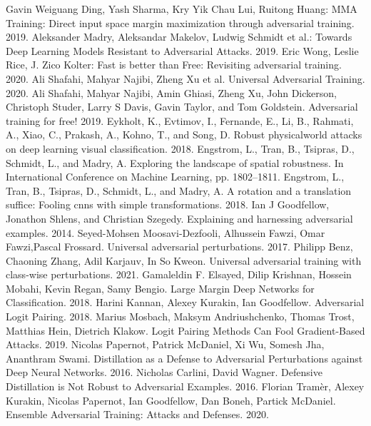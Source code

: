 \documentclass{article}
\begin{document}
\begin{thebibliography}{00}

     Gavin Weiguang Ding, Yash Sharma, Kry Yik Chau Lui, Ruitong Huang: MMA Training: Direct input space margin maximization through adversarial training. 2019.
     Aleksander Madry, Aleksandar Makelov, Ludwig Schmidt et al.: Towards Deep Learning Models Resistant to Adversarial Attacks. 2019.
     Eric Wong, Leslie Rice, J. Zico Kolter: Fast is better than Free: Revisiting adversarial training. 2020.
     Ali Shafahi, Mahyar Najibi, Zheng Xu et al. Universal Adversarial Training. 2020.
     Ali Shafahi, Mahyar Najibi, Amin Ghiasi, Zheng Xu, John Dickerson, Christoph Studer, Larry S Davis, Gavin Taylor, and Tom Goldstein. Adversarial training for free! 2019.
     Eykholt, K., Evtimov, I., Fernande, E., Li, B., Rahmati, A., Xiao, C., Prakash, A., Kohno, T., and Song, D. Robust physicalworld attacks on deep learning visual classification. 2018.
     Engstrom, L., Tran, B., Tsipras, D., Schmidt, L., and Madry, A. Exploring the landscape of spatial robustness. In International Conference on Machine Learning, pp. 1802–1811.
     Engstrom, L., Tran, B., Tsipras, D., Schmidt, L., and Madry, A. A rotation and a translation suffice: Fooling cnns with simple transformations. 2018.
     Ian J Goodfellow, Jonathon Shlens, and Christian Szegedy. Explaining and harnessing adversarial examples. 2014.
     Seyed-Mohsen Moosavi-Dezfooli, Alhussein Fawzi, Omar Fawzi,Pascal Frossard. Universal adversarial perturbations. 2017.
     Philipp Benz, Chaoning Zhang, Adil Karjauv, In So Kweon. Universal adversarial training with class-wise perturbations. 2021.
     Gamaleldin F. Elsayed, Dilip Krishnan, Hossein Mobahi, Kevin Regan, Samy Bengio. Large Margin Deep Networks for Classification. 2018.
     Harini Kannan, Alexey Kurakin, Ian Goodfellow. Adversarial Logit Pairing. 2018.
     Marius Mosbach, Maksym Andriushchenko, Thomas Trost, Matthias Hein, Dietrich Klakow. Logit Pairing Methods Can Fool Gradient-Based Attacks. 2019.
     Nicolas Papernot, Patrick McDaniel, Xi Wu, Somesh Jha, Ananthram Swami. Distillation as a Defense to Adversarial Perturbations against Deep Neural Networks. 2016.
     Nicholas Carlini, David Wagner. Defensive Distillation is Not Robust to Adversarial Examples. 2016.
     Florian Tramèr, Alexey Kurakin, Nicolas Papernot, Ian Goodfellow, Dan Boneh, Partick McDaniel. Ensemble Adversarial Training: Attacks and Defenses. 2020.

\end{thebibliography}
\end{document}
